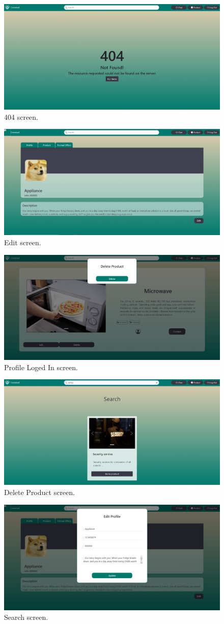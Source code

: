 \documentclass[./main.tex]{subfiles}
\begin{document}
\begin{figure}[H]
  \centering
  \includegraphics[width=0.5\linewidth]{img/webclient_11.png}
  \caption{404 screen.}
  \label{fig:webclient-screen-10}
\end{figure}
\begin{figure}[H]
  \centering
  \includegraphics[width=0.5\linewidth]{img/webclient_13.png}
  \caption{Edit screen.}
  \label{fig:webclient-screen-11}
\end{figure}
\begin{figure}[H]
  \centering
  \includegraphics[width=0.5\linewidth]{img/webclient_14.png}
  \caption{Profile Loged In screen.}
  \label{fig:webclient-screen-12}
\end{figure}
\begin{figure}[H]
  \centering
  \includegraphics[width=0.5\linewidth]{img/webclient_15.png}
  \caption{Delete Product screen.}
  \label{fig:webclient-screen-13}
\end{figure}
\begin{figure}[H]
  \centering
  \includegraphics[width=0.5\linewidth]{img/webclient-16.jpg}
  \caption{Search screen.}
  \label{fig:webclient-screen-14}
\end{figure}
\end{document}
